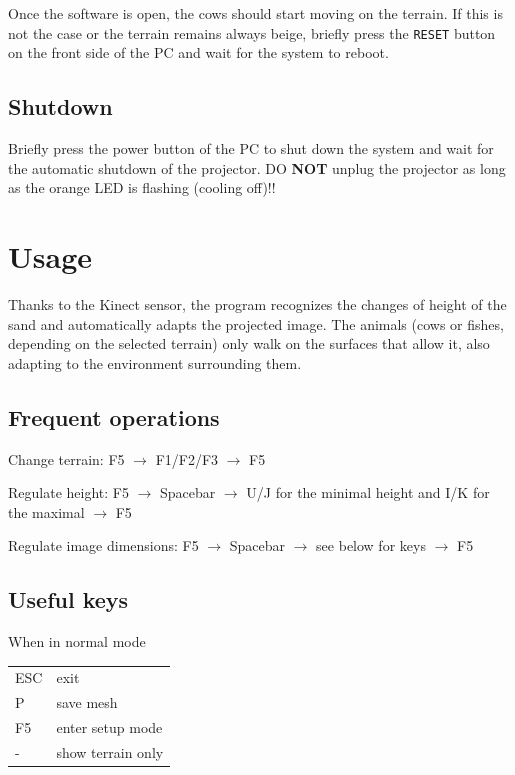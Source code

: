 \documentclass[12pt]{article}
\begin{document}
Once the software is open, the cows should start moving on the terrain. If this is not the case or the terrain remains always beige,
briefly press the \texttt{RESET} button on the front side of the PC and wait for the system to reboot.\\


\subsection{Shutdown}

Briefly press the power button of the PC to shut down the system and wait for the automatic shutdown of the projector.
DO \textbf{NOT} unplug the projector as long as the orange LED is flashing (cooling off)!!


\section{Usage}

Thanks to the Kinect sensor, the program recognizes the changes of height of the sand and automatically adapts the projected image.
The animals (cows or fishes, depending on the selected terrain) only walk on the surfaces that allow it, also adapting to the environment surrounding them.

\subsection{Frequent operations}

Change terrain: F5 $\rightarrow$ F1/F2/F3 $\rightarrow$ F5

Regulate height: F5 $\rightarrow$ Spacebar $\rightarrow$ U/J for the minimal height and I/K for the maximal $\rightarrow$ F5

Regulate image dimensions: F5 $\rightarrow$ Spacebar $\rightarrow$ see below for keys $\rightarrow$ F5

\newpage
\subsection{Useful keys}\label{sec:commands}

When in normal mode

\begin{tabular}{l l}
	ESC & exit              \\
	P   & save mesh         \\
	F5  & enter setup mode  \\
	-   & show terrain only \\
\end{tabular}
\end{document}
